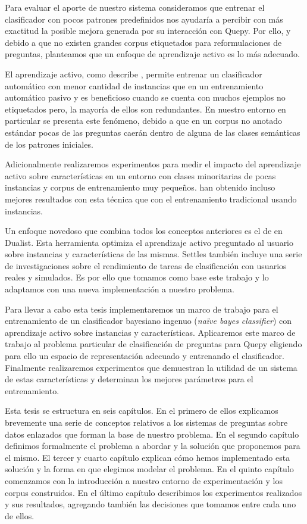 Para evaluar el aporte de nuestro sistema consideramos que entrenar el clasificador con pocos patrones predefinidos nos ayudaría a percibir con más exactitud la posible mejora generada por su interacción con Quepy. Por ello, y debido a que no existen grandes corpus etiquetados para reformulaciones de preguntas, planteamos que un enfoque de aprendizaje activo es lo más adecuado.

El aprendizaje activo, como describe \citet{settles_active_learning_survey}, permite entrenar un clasificador automático con menor cantidad de instancias que en un entrenamiento automático pasivo y es beneficioso cuando se cuenta con muchos ejemplos no etiquetados pero, la mayoría de ellos son redundantes. En nuestro entorno en particular se presenta este fenómeno, debido a que en un corpus no anotado estándar pocas de las preguntas caerán dentro de alguna de las clases semánticas de los patrones iniciales.

Adicionalmente realizaremos experimentos para medir el impacto del aprendizaje activo sobre características en un entorno con clases minoritarias de pocas instancias y corpus de entrenamiento muy pequeños. \citet{settles-al-features} han obtenido incluso mejores resultados con esta técnica que con el entrenamiento tradicional usando instancias.

Un enfoque novedoso que combina todos los conceptos anteriores es el de \citet{dualist} en Dualist. Esta herramienta optimiza el aprendizaje activo preguntado al usuario sobre instancias y características de las mismas. Settles también incluye una serie de investigaciones sobre el rendimiento de tareas de clasificación con usuarios reales y simulados. Es por ello que tomamos como base este trabajo y lo adaptamos con una nueva implementación a nuestro problema.

Para llevar a cabo esta tesis implementaremos un marco de trabajo para el entrenamiento de un clasificador bayesiano ingenuo (\textit{naïve bayes classifier}) con aprendizaje activo sobre instancias y características. Aplicaremos este marco de trabajo al problema particular de clasificación de preguntas para Quepy eligiendo para ello un espacio de representación adecuado y entrenando el clasificador. Finalmente realizaremos experimentos que demuestran la utilidad de un sistema de estas características y determinan los mejores parámetros para el entrenamiento.

Esta tesis se estructura en seis capítulos. En el primero de ellos explicamos brevemente una serie de conceptos relativos a los sistemas de preguntas sobre datos enlazados que forman la base de nuestro problema. En el segundo capítulo definimos formalmente el problema a abordar y la solución que proponemos para el mismo. El tercer y cuarto capítulo explican cómo hemos implementado esta solución y la forma en que elegimos modelar el problema. En el quinto capítulo comenzamos con la introducción a nuestro entorno de experimentación y los corpus construidos. En el último capítulo describimos los experimentos realizados y sus resultados, agregando también las decisiones que tomamos entre cada uno de ellos.